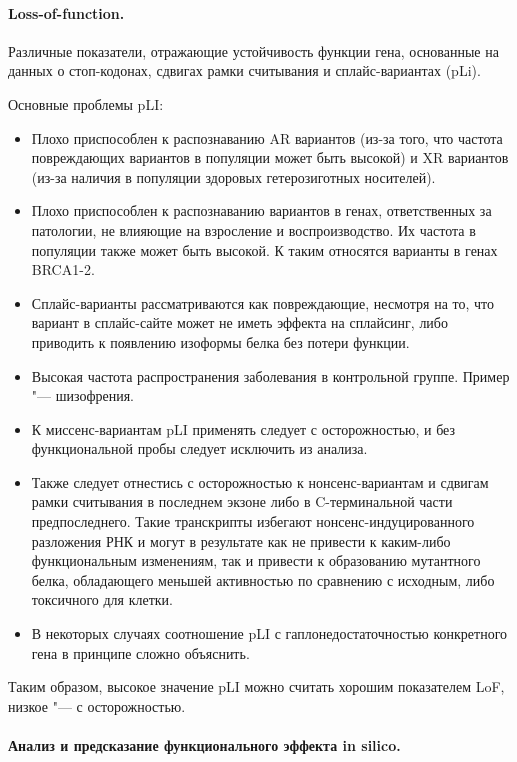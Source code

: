 \documentclass[a4paper,12pt]{article}
\begin{document}
\paragraph{Loss-of-function.}
Различные показатели, отражающие устойчивость функции гена, основанные на данных о стоп-кодонах, сдвигах рамки считывания и сплайс-вариантах (pLi).

Основные проблемы pLI:

\begin{itemize}
\item Плохо приспособлен к распознаванию AR вариантов (из-за того, что частота повреждающих вариантов в популяции может быть высокой) и XR вариантов (из-за наличия в популяции здоровых гетерозиготных носителей).
\item Плохо приспособлен к распознаванию вариантов в генах, ответственных за патологии, не влияющие на взросление и воспроизводство.
Их частота в популяции также может быть высокой.
К таким относятся варианты в генах BRCA1-2.
\item Сплайс-варианты рассматриваются как повреждающие, несмотря на то, что вариант в сплайс-сайте может не иметь эффекта на сплайсинг, либо приводить к появлению изоформы белка без потери функции.
\item Высокая частота распространения заболевания в контрольной группе.
Пример "--- шизофрения.
\item К миссенс-вариантам pLI применять следует с осторожностью, и без функциональной пробы следует исключить из анализа.
\item Также следует отнестись с осторожностью к нонсенс-вариантам и сдвигам рамки считывания в последнем экзоне либо в C-терминальной части предпоследнего.
Такие транскрипты избегают нонсенс-индуцированного разложения РНК и могут в результате как не привести к каким-либо функциональным изменениям, так и привести к образованию мутантного белка, обладающего меньшей активностью по сравнению с исходным, либо токсичного для клетки.
\item В некоторых случаях соотношение pLI с гаплонедостаточностью конкретного гена в принципе сложно объяснить\cite{ziegler}.
\end{itemize}

Таким образом, высокое значение pLI можно считать хорошим показателем LoF, низкое "--- с осторожностью.

\paragraph{Анализ и предсказание функционального эффекта in silico.}
\end{document}
